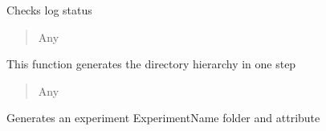 \documentclass[letterpaper,10pt,english]{sphinxmanual}
\begin{document}
\begin{fulllineitems}
\begin{description}
\end{description}

\begin{fulllineitems}
\label{\detokenize{Organization:Organization.Mouse.check_log}}
\pysigstartsignatures
{}
\pysigstopsignatures
\sphinxAtStartPar
Checks log status
\begin{quote}\begin{description}
\sphinxAtStartPar
Any

\end{description}\end{quote}

\end{fulllineitems}


\begin{fulllineitems}
\label{\detokenize{Organization:Organization.Mouse.create}}
\pysigstartsignatures
{}
\pysigstopsignatures
\sphinxAtStartPar
This function generates the directory hierarchy in one step
\begin{quote}\begin{description}
\sphinxAtStartPar
Any

\end{description}\end{quote}

\end{fulllineitems}


\begin{fulllineitems}
\label{\detokenize{Organization:Organization.Mouse.create_experiment}}
\pysigstartsignatures
{}
\pysigstopsignatures
\sphinxAtStartPar
Generates an experiment ExperimentName folder and attribute


\end{fulllineitems}
\end{fulllineitems}
\end{document}
